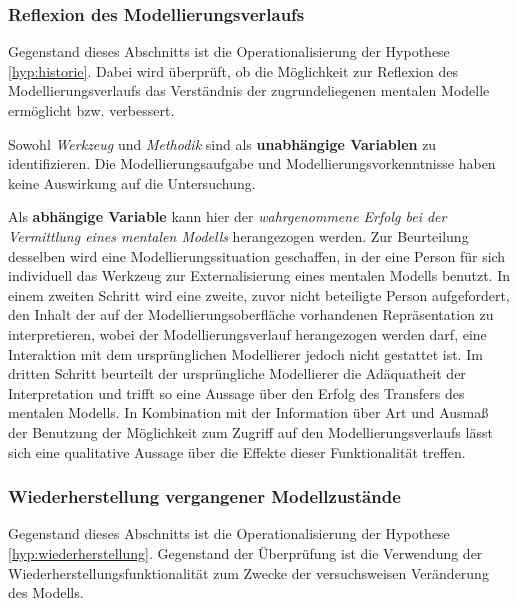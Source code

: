 
\subsubsection{Reflexion des Modellierungsverlaufs} %
\label{ssub:reflexion_des_modellierungsverlaufs}

Gegenstand dieses Abschnitts ist die Operationalisierung der Hypothese \ref{hyp:historie}. Dabei wird überprüft, ob die Möglichkeit zur Reflexion des Modellierungsverlaufs das Verständnis der zugrundeliegenen mentalen Modelle ermöglicht bzw. verbessert.

Sowohl \emph{Werkzeug} und \emph{Methodik} sind als \textbf{unabhängige Variablen} zu identifizieren. Die Modellierungsaufgabe und Modellierungsvorkenntnisse haben keine Auswirkung auf die Untersuchung.

Als \textbf{abhängige Variable} kann hier der \emph{wahrgenommene Erfolg bei der Vermittlung eines mentalen Modells} herangezogen werden. Zur Beurteilung desselben wird eine Modellierungssituation geschaffen, in der eine Person für sich individuell das Werkzeug zur Externalisierung eines mentalen Modells benutzt. In einem zweiten Schritt wird eine zweite, zuvor nicht beteiligte Person aufgefordert, den Inhalt der auf der Modellierungsoberfläche vorhandenen Repräsentation zu interpretieren, wobei der Modellierungsverlauf herangezogen werden darf, eine Interaktion mit dem ursprünglichen Modellierer jedoch nicht gestattet ist. Im dritten Schritt beurteilt der ursprüngliche Modellierer die Adäquatheit der Interpretation und trifft so eine Aussage über den Erfolg des Transfers des mentalen Modells. In Kombination mit der Information über Art und Ausmaß der Benutzung der Möglichkeit zum Zugriff auf den Modellierungsverlaufs lässt sich eine qualitative Aussage über die Effekte dieser Funktionalität treffen.    


\subsubsection{Wiederherstellung vergangener Modellzustände} %
\label{ssub:wiederherstellung_vergangener_modellzustände}

Gegenstand dieses Abschnitts ist die Operationalisierung der Hypothese \ref{hyp:wiederherstellung}. Gegenstand der Überprüfung ist die Verwendung der Wiederherstellungsfunktionalität zum Zwecke der versuchsweisen Veränderung des Modells.


